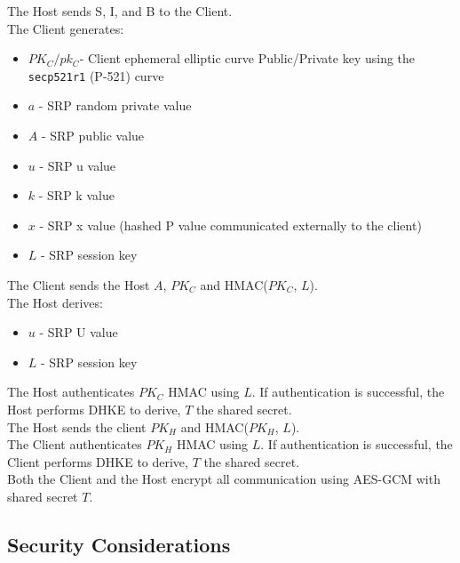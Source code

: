 \documentclass{article}
\begin{document}
    The Host sends S, I, and B to the Client.\\

    The Client generates:\\

    \begin{itemize}
        \item $PK_C/pk_C$- Client ephemeral elliptic curve Public/Private
        key using the \texttt{secp521r1} (P-521) curve
        \item $a$ - SRP random private value
        \item $A$ - SRP public value
        \item $u$ - SRP u value
        \item $k$ - SRP k value
        \item $x$ - SRP x value (hashed P value communicated externally to the client)
        \item $L$ - SRP session key
    \end{itemize}

    The Client sends the Host $A$, $PK_C$ and HMAC($PK_C$, $L$).\\

    The Host derives:\\

    \begin{itemize}
        \item $u$ - SRP U value
        \item $L$ - SRP session key
    \end{itemize}

    The Host authenticates $PK_C$ HMAC using $L$. If authentication is
    successful, the Host performs DHKE to derive, $T$ the shared secret.\\

    The Host sends the client $PK_H$ and HMAC($PK_H$, $L$).\\

    The Client authenticates $PK_H$ HMAC using $L$. If authentication is
    successful, the Client performs DHKE to derive, $T$ the shared secret.\\

    Both the Client and the Host encrypt all communication using AES-GCM with shared
    secret $T$.\\ %

    \subsection{Security Considerations}
\end{document}
